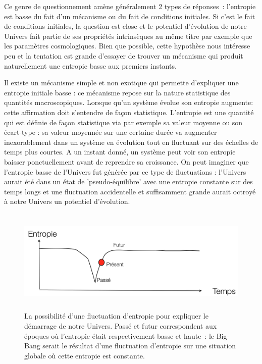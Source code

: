 Ce genre de questionnement amène généralement 2 types de réponses~: l'entropie est basse du fait d'un mécanisme ou du fait de conditions initiales. Si c'est le fait de conditions initiales, la question est close et le potentiel d'évolution de notre Univers fait partie de ses propriétés intrinsèques au même titre par exemple que les paramètres cosmologiques. Bien que possible, cette hypothèse nous intéresse peu et la tentation est grande d'essayer de trouver un mécanisme qui produit naturellement une entropie basse aux premiers instants.

Il existe un mécanisme simple et non exotique qui permette d'expliquer une entropie initiale basse : ce mécanisme repose sur la nature statistique des quantités macroscopiques. Lorsque qu'un système évolue son entropie augmente: cette affirmation doit s'entendre de façon statistique. L'entropie est une quantité qui est définie de façon statistique via par exemple sa valeur moyenne ou son écart-type : sa valeur moyennée sur une certaine durée va augmenter inexorablement dans un système en évolution tout en fluctuant sur des échelles de temps plus courtes. A un instant donné, un système peut voir son entropie baisser ponctuellement avant de reprendre sa croissance. On peut imaginer que l'entropie basse de l'Univers fut générée par ce type de fluctuations : l'Univers aurait été dans un état de 'pseudo-équilibre' avec une entropie constante sur des temps longs et une fluctuation accidentelle et suffisamment grande aurait octroyé à notre Univers un potentiel d'évolution.
\begin{figure}[htbp]
	\centering
		\includegraphics[height=5cm]{figs/fluctuation.png}
	\caption[fluctuation d'entropie]{La possibilité d'une fluctuation d'entropie pour expliquer le démarrage de notre Univers. Passé et futur correspondent aux époques où l'entropie était respectivement basse et haute~: le Big-Bang serait le résultat d'une fluctuation d'entropie sur une situation globale où cette entropie est constante.}
	\label{f:fluctuation}
\end{figure}

